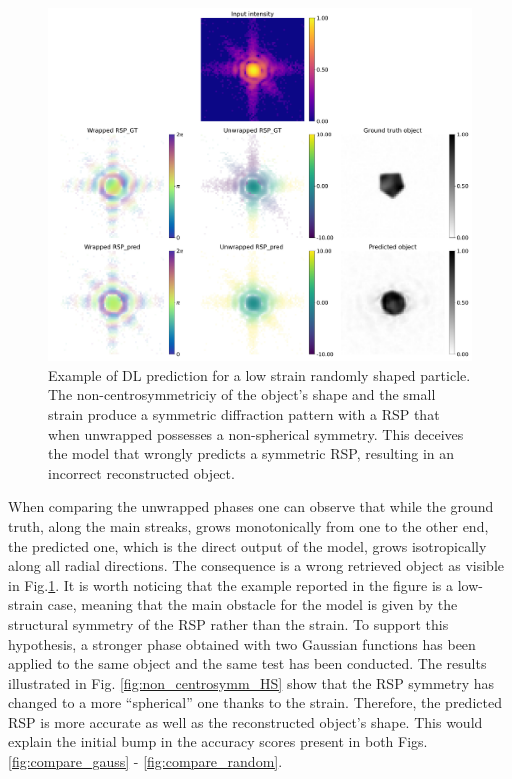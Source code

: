 \begin{figure}[H]
    \centering
    \includegraphics[width=\textwidth]{figures/Phasing/non_centrosymmetric_study_3d_random_LS0.pdf}
    \caption{Example of DL prediction for a low strain randomly shaped particle. The non-centrosymmetriciy of the object's 
    shape and the small strain produce a symmetric diffraction pattern with a RSP that when unwrapped possesses a non-spherical 
    symmetry. This deceives the model that wrongly predicts a symmetric RSP, resulting in an incorrect reconstructed object. }
    \label{fig:non_centrosymm_LS}
\end{figure}

When comparing the unwrapped phases one can observe that while the ground truth, along the main streaks, grows monotonically 
from one to the other end, the predicted one, which is the direct output of the model, grows isotropically along all radial 
directions. The consequence is a wrong retrieved object as visible in Fig.\ref{fig:non_centrosymm_LS}. 
It is worth noticing that the example reported in the figure is a low-strain case, meaning that the main obstacle for 
the model is given by the structural symmetry of the RSP rather than the strain. 
To support this hypothesis, a stronger phase obtained with two Gaussian functions has been applied to the same object and 
the same test has been conducted. The results illustrated in Fig. \ref{fig:non_centrosymm_HS} show that the RSP symmetry 
has changed to a more ``spherical'' one thanks to the strain. Therefore, the predicted RSP is more accurate as well as 
the reconstructed object's shape. This would explain the initial bump in the accuracy scores present in both Figs. 
\ref{fig:compare_gauss} - \ref{fig:compare_random}. 


